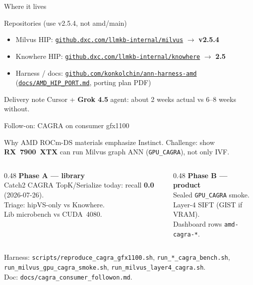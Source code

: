\documentclass[aspectratio=169,11pt]{beamer}
\begin{document}
\begin{frame}{Where it lives}
  \begin{block}{Repositories (use v2.5.4, not amd/main)}
    \begin{itemize}
      \item Milvus HIP:
            \href{https://github.dxc.com/llmkb-internal/milvus/tree/v2.5.4}{\texttt{github.dxc.com/llmkb-internal/milvus}}
            $\rightarrow$ \textbf{v2.5.4}
      \item Knowhere HIP:
            \href{https://github.dxc.com/llmkb-internal/knowhere}{\texttt{github.dxc.com/llmkb-internal/knowhere}}
            $\rightarrow$ \textbf{2.5}
      \item Harness / docs:
            \href{https://github.com/konkolchin/ann-harness-amd}{\texttt{github.com/konkolchin/ann-harness-amd}}
            (\href{https://github.dxc.com/llmkb-internal/milvus/blob/v2.5.4/docs/AMD_HIP_PORT.md}{\texttt{docs/AMD\_HIP\_PORT.md}},
            porting plan PDF)
    \end{itemize}
  \end{block}

  \begin{block}{Delivery note}
    Cursor + \textbf{Grok 4.5} agent:
    about 2 weeks actual vs 6--8 weeks without.
  \end{block}
\end{frame}

\begin{frame}{Follow-on: CAGRA on consumer gfx1100}
  \begin{block}{Why}
    AMD ROCm-DS materials emphasize Instinct.
    Challenge: show \textbf{RX~7900~XTX} can run Milvus graph ANN
    (\texttt{GPU\_CAGRA}), not only IVF.
  \end{block}
  \begin{columns}[T]
    \begin{column}{0.48\textwidth}
      \textbf{Phase A --- library}\\[0.3em]
      \footnotesize
      Catch2 CAGRA TopK/Serialize today:
      recall \textbf{0.0} (2026-07-26).\\
      Triage: hipVS-only vs Knowhere.\\
      Lib microbench vs CUDA~4080.
    \end{column}
    \begin{column}{0.48\textwidth}
      \textbf{Phase B --- product}\\[0.3em]
      \footnotesize
      Sealed \texttt{GPU\_CAGRA} smoke.\\
      Layer-4 SIFT (GIST if VRAM).\\
      Dashboard rows \texttt{amd-cagra-*}.
    \end{column}
  \end{columns}
  \vspace{0.6em}
  \footnotesize
  Harness: \texttt{scripts/reproduce\_cagra\_gfx1100.sh},
  \texttt{run\_*\_cagra\_bench.sh},
  \texttt{run\_milvus\_gpu\_cagra\_smoke.sh},
  \texttt{run\_milvus\_layer4\_cagra.sh}.\\
  Doc: \texttt{docs/cagra\_consumer\_followon.md}.
\end{frame}
\end{document}
